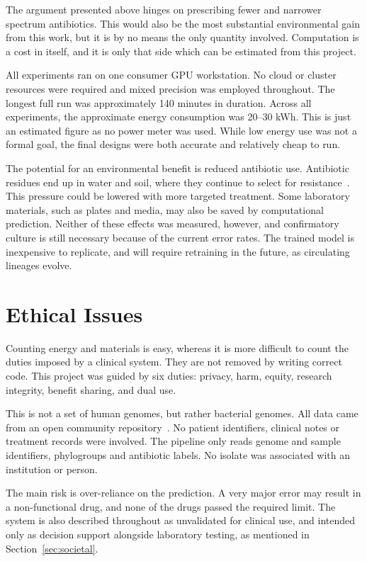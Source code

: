 The argument presented above hinges on prescribing fewer and narrower spectrum antibiotics.
This would also be the most substantial environmental gain from this work, but it is by no
means the only quantity involved. Computation is a cost in itself, and it is only that side
which can be estimated from this project.

All experiments ran on one consumer GPU workstation. No cloud or cluster resources were required
and mixed precision was employed throughout. The longest full run was approximately 140 minutes
in duration. Across all experiments, the approximate energy consumption was 20--30 kWh. This is
just an estimated figure as no power meter was used. While low energy use was not a formal
goal, the final designs were both accurate and relatively cheap to run.

The potential for an environmental benefit is reduced antibiotic use. Antibiotic residues end
up in water and soil, where they continue to select for resistance~\cite{Liu2024}. This
pressure could be lowered with more targeted treatment. Some laboratory materials, such as
plates and media, may also be saved by computational prediction. Neither of these effects was
measured, however, and confirmatory culture is still necessary because of the current error
rates. The trained model is inexpensive to replicate, and will require retraining in the
future, as circulating lineages evolve.

\section{Ethical Issues}
\label{sec:ethics}

Counting energy and materials is easy, whereas it is more difficult to count the duties imposed
by a clinical system. They are not removed by writing correct code. This project was
guided by six duties: privacy, harm, equity, research integrity, benefit sharing, and dual use.

This is not a set of human genomes, but rather bacterial genomes. All data came from an open
community repository~\cite{morin2024ecoli, york2025amr}. No patient identifiers, clinical notes
or treatment records were involved. The pipeline only reads genome and sample identifiers,
phylogroups and antibiotic labels. No isolate was associated with an institution or person.

The main risk is over-reliance on the prediction. A very major error may result in a
non-functional drug, and none of the drugs passed the required limit. The system is also
described throughout as unvalidated for clinical use, and intended only as decision support alongside
laboratory testing, as mentioned in Section~\ref{sec:societal}.

